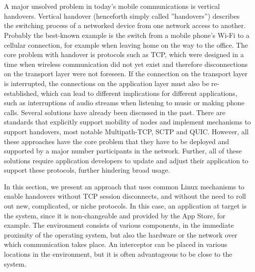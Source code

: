 \section{\wgh}
\label{sec:wg:impl}

\newcommand{\ld}{\texttt{LD\_PRELOAD}\xspace}

A major unsolved problem in today's mobile communications is vertical handovers.
Vertical handover (henceforth simply called ''handovers'') describes the switching process of a networked device from one network access to another.
Probably the best-known example is the switch from a mobile phone's Wi-Fi to a cellular connection, for example when leaving home on the way to the office.
The core problem with handover is protocols such as TCP, which were designed in a time when wireless communication did not yet exist and therefore disconnections on the transport layer were not foreseen.
If the connection on the transport layer is interrupted, the connections on the application layer must also be re-established, which can lead to different implications for different applications, such as interruptions of audio streams when listening to music or making phone calls.
Several solutions have already been discussed in the past.
There are standards that explicitly support mobility of nodes and implement mechanisms to support handovers, most notable Multipath-TCP, SCTP and QUIC.
However, all these approaches have the core problem that they have to be deployed and supported by a major number participants in the network.
Further, all of these solutions require application developers to update and adjust their application to support these protocols, further hindering broad usage.

In this section, we present an approach that uses common Linux mechanisms to enable handovers without TCP session disconnects, and without the need to roll out new, complicated, or niche protocols.
In this case, an application at target is the system, since it is non-changeable and provided by the App Store, for example.
The environment consists of various components, in the immediate proximity of the operating system, but also the hardware or the network over which communication takes place.
An interceptor can be placed in various locations in the environment, but it is often advantageous to be close to the system. 





